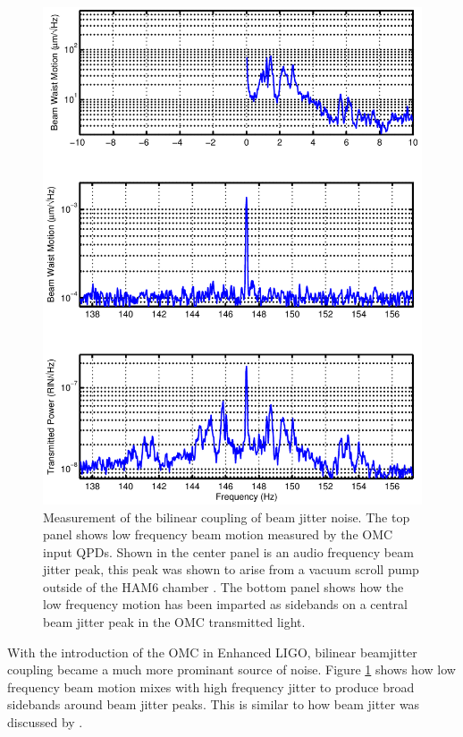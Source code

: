 \begin{figure}
  \begin{center}
  \leavevmode
  \includegraphics{figs-jitter/bilinearplot.pdf}
  \end{center}
  \caption[Measurement of the bilinear coupling of beam jitter noise.]{Measurement of the bilinear coupling of beam jitter noise. The top panel shows low frequency beam motion measured by the OMC input QPDs. Shown in the center panel is an audio frequency beam jitter peak, this peak was shown to arise from a vacuum scroll pump outside of the HAM6 chamber \cite{robert147}. The bottom panel shows how the low frequency motion has been imparted as sidebands on a central beam jitter peak in the OMC transmitted light. }
  \label{fig:bilinear}
\end{figure}

With the introduction of the OMC in Enhanced LIGO, bilinear beamjitter coupling became a much more prominant source of noise. %
Figure \ref{fig:bilinear} shows how low frequency beam motion mixes with high frequency jitter to produce broad sidebands around beam jitter peaks. %
This is similar to how beam jitter was discussed by \citet{Tobin}.

